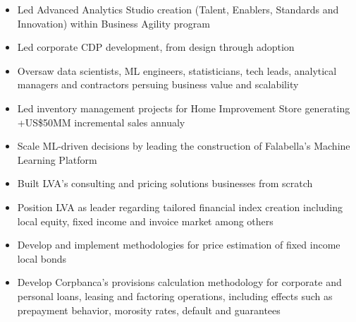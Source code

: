 \documentclass[10pt,a4paper,ragged2e,withhyper]{altacv}
\begin{document}
\begin{paracol}{2}



\begin{itemize}
\item Led Advanced Analytics Studio creation (Talent, Enablers, Standards and Innovation) within Business Agility program
\item Led corporate CDP development, from design through adoption
\item Oversaw data scientists, ML engineers, statisticians, tech leads, analytical managers and contractors persuing business value and scalability 
\item Led inventory management projects for Home Improvement Store generating +US\$50MM incremental sales annualy
\item Scale ML-driven decisions by leading the construction of Falabella's Machine Learning Platform
\end{itemize}

\medskip

\begin{itemize}
\item Built LVA's consulting and pricing solutions businesses from scratch
\item Position LVA as leader regarding tailored financial index creation including local equity, fixed income and invoice market among others
\end{itemize}

\medskip

\begin{itemize}
\item Develop and implement methodologies for price estimation of fixed income local bonds

\end{itemize}

\medskip

\begin{itemize}
\item Develop Corpbanca's provisions calculation methodology for corporate and personal loans, leasing and factoring operations, including effects such as prepayment behavior, morosity rates, default and guarantees


\end{itemize}
\end{paracol}
\end{document}
